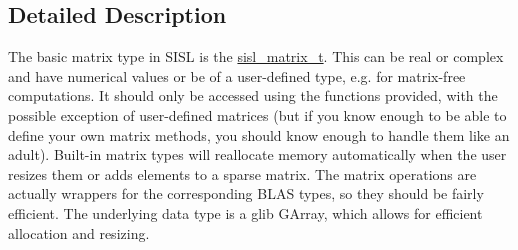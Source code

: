\subsection{Detailed Description}
The basic matrix type in S\-I\-S\-L is the \hyperlink{group__matrix_gad147923587b355644defb9bfbf981740}{sisl\-\_\-matrix\-\_\-t}. This can be real or complex and have numerical values or be of a user-\/defined type, e.\-g. for matrix-\/free computations. It should only be accessed using the functions provided, with the possible exception of user-\/defined matrices (but if you know enough to be able to define your own matrix methods, you should know enough to handle them like an adult). Built-\/in matrix types will reallocate memory automatically when the user resizes them or adds elements to a sparse matrix. The matrix operations are actually wrappers for the corresponding B\-L\-A\-S types, so they should be fairly efficient. The underlying data type is a glib G\-Array, which allows for efficient allocation and resizing. 

